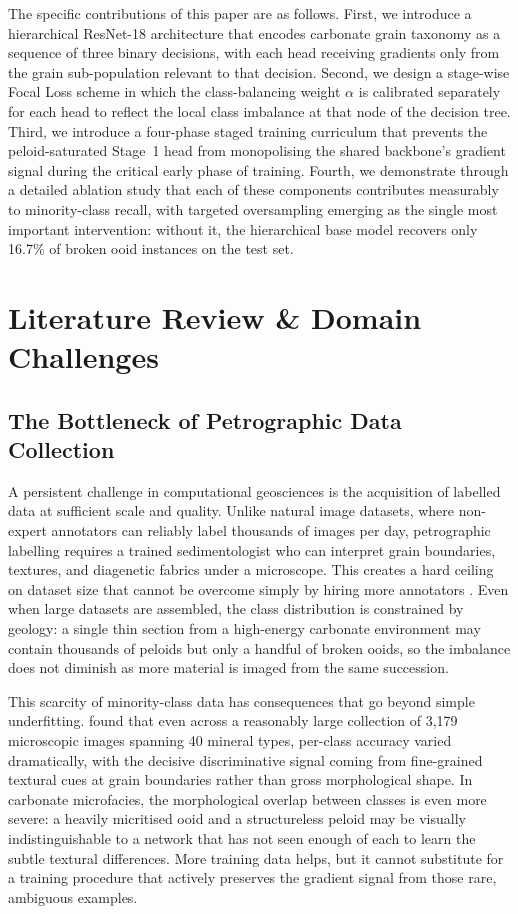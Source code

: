 \documentclass[a4paper,fleqn]{cas-dc}
\begin{document}
The specific contributions of this paper are as follows. First, we introduce a hierarchical ResNet-18 architecture that encodes carbonate grain taxonomy as a sequence of three binary decisions, with each head receiving gradients only from the grain sub-population relevant to that decision. Second, we design a stage-wise Focal Loss scheme in which the class-balancing weight $\alpha$ is calibrated separately for each head to reflect the local class imbalance at that node of the decision tree. Third, we introduce a four-phase staged training curriculum that prevents the peloid-saturated Stage~1 head from monopolising the shared backbone's gradient signal during the critical early phase of training. Fourth, we demonstrate through a detailed ablation study that each of these components contributes measurably to minority-class recall, with targeted oversampling emerging as the single most important intervention: without it, the hierarchical base model recovers only 16.7\% of broken ooid instances on the test set.

\section{Literature Review \& Domain Challenges}

\subsection{The Bottleneck of Petrographic Data Collection}
A persistent challenge in computational geosciences is the acquisition of labelled data at sufficient scale and quality. Unlike natural image datasets, where non-expert annotators can reliably label thousands of images per day, petrographic labelling requires a trained sedimentologist who can interpret grain boundaries, textures, and diagenetic fabrics under a microscope. This creates a hard ceiling on dataset size that cannot be overcome simply by hiring more annotators \citep{koeshidayatullah2020}. Even when large datasets are assembled, the class distribution is constrained by geology: a single thin section from a high-energy carbonate environment may contain thousands of peloids but only a handful of broken ooids, so the imbalance does not diminish as more material is imaged from the same succession.

This scarcity of minority-class data has consequences that go beyond simple underfitting. \citet{dalhat2025} found that even across a reasonably large collection of 3,179 microscopic images spanning 40 mineral types, per-class accuracy varied dramatically, with the decisive discriminative signal coming from fine-grained textural cues at grain boundaries rather than gross morphological shape. In carbonate microfacies, the morphological overlap between classes is even more severe: a heavily micritised ooid and a structureless peloid may be visually indistinguishable to a network that has not seen enough of each to learn the subtle textural differences. More training data helps, but it cannot substitute for a training procedure that actively preserves the gradient signal from those rare, ambiguous examples.
\end{document}
